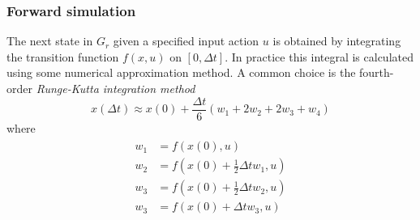 \subsubsection{Forward simulation}
The next state in $G_r$ given a specified input action $u$ is obtained by 
integrating the transition function $f(x, u)$ on $[0, \Delta t]$. In practice this 
integral is calculated using some numerical approximation method. A common choice is the 
fourth-order \textit{Runge-Kutta integration method}
\begin{equation}
    x(\Delta t)\approx x(0) + \frac{\Delta t}{6}(w_1 + 2w_2 + 2w_3 + w_4)
\end{equation}
where
\begin{align}
\begin{split}
    w_1 &= f(x(0), u) \\
    w_2 &= f(x(0) + \frac{1}{2}\Delta t w_1, u) \\
    w_3 &= f(x(0) + \frac{1}{2}\Delta t w_2, u) \\
    w_3 &= f(x(0) + \Delta t w_3, u)
\end{split}
\end{align}